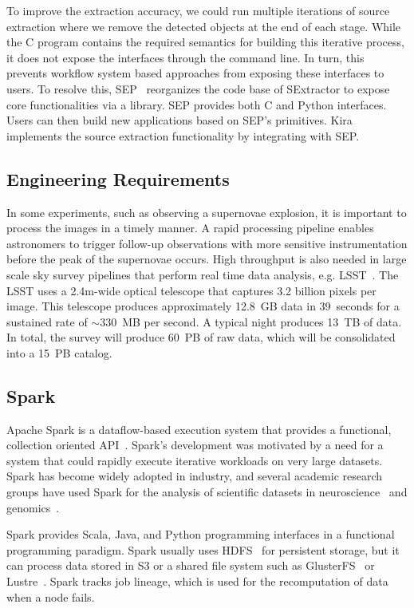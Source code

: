 \documentclass[10pt, conference, compsocconf]{IEEEtran}
\begin{document}
To improve the extraction accuracy, we could run multiple iterations of source
extraction where we remove the detected objects at the end of each stage. While
the C program contains the required semantics for building this iterative process,
it does not expose the interfaces through the command line. In turn, this prevents
workflow system based approaches from exposing these interfaces to users. To resolve this,
SEP~\cite{barbary2015} reorganizes the code base of SExtractor to expose core
functionalities via a library. SEP provides both C and Python interfaces. Users can then
build new applications based on SEP's primitives. Kira implements the source extraction
functionality by integrating with SEP.

\subsection{Engineering Requirements}
\label{sec:Background-EngReq}

In some experiments, such as observing a supernovae explosion, it is important to process
the images in a timely manner. A rapid processing pipeline enables astronomers to trigger follow-up
observations with more sensitive instrumentation before the peak of the supernovae occurs.
High throughput is also needed in large scale
sky survey pipelines that perform real time data analysis, e.g. LSST~\cite{ivezic08}.
The LSST uses a 2.4m-wide optical telescope that captures 3.2 billion pixels per
image. This telescope produces approximately 12.8~GB data in 39~seconds
for a sustained rate of $\sim$330~MB per second. A typical night produces 13~TB of data. In
total, the survey will produce 60~PB of raw data, which will be consolidated into a 15~PB catalog.

\subsection{Spark}
Apache Spark is a dataflow-based execution system that provides a functional, collection
oriented API~\cite{zaharia12}. \linebreak Spark's development was motivated by a need for a
system that could rapidly execute iterative workloads on very large datasets. Spark has
become widely adopted in industry, and several academic research groups have used Spark
for the analysis of scientific datasets in neuroscience~\cite{freeman14} and genomics~\cite{nothaft15}.

Spark provides Scala, Java, and Python programming interfaces in a functional
programming paradigm. Spark usually uses HDFS~\cite{shvachko10} for persistent storage, but
it can process data stored in S3 or a shared file system such as
GlusterFS~\cite{davies13} or Lustre~\cite{donovan03}. Spark tracks job lineage, which is used for the
recomputation of data when a node fails. 
\end{document}
